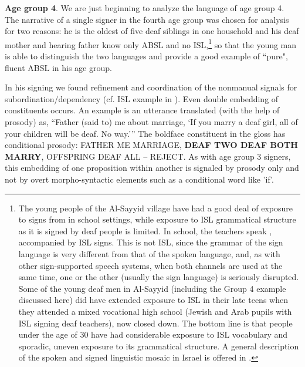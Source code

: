 \documentclass[output=paper]{langsci/langscibook}
\begin{document}
\largerpage[-1] 
\textbf{Age group 4}.  We are just beginning to analyze the language of age group 4.  The narrative of a single signer in the fourth age group was chosen for analysis for two reasons:  he is the oldest of five deaf siblings in one household and his deaf mother and hearing father know only ABSL and no ISL,\footnote{The young people of the Al-Sayyid village have had a good deal of exposure to signs from  in school settings, while exposure to ISL grammatical structure as it is signed by deaf people is limited.  In school, the teachers speak , accompanied by ISL signs. This is not ISL, since the grammar of the sign language is very different from that of the spoken language, and, as with other sign-supported speech systems, when both channels are used at the same time, one or the other (usually the sign language) is seriously disrupted.  Some of the young deaf men in Al-Sayyid (including the Group 4 example discussed here) did have extended exposure to ISL in their late teens when they attended a mixed vocational high school (Jewish and Arab pupils with ISL signing deaf teachers), now closed down. The bottom line is that people under the age of 30 have had considerable exposure to ISL vocabulary and sporadic, uneven exposure to its grammatical structure.  A general description of the spoken and signed linguistic mosaic in Israel is offered in \citet{Sandler2014nordlyd}.} so that the young man is able to distinguish the two languages and provide a good example of ``pure", fluent ABSL in his age group.

In his signing we found refinement and coordination of the nonmanual signals for subordination/dependency (cf. ISL example in ).  Even double embedding of constituents occurs.  An example is an utterance translated (with the help of prosody) as, “Father (said to) me about marriage, ‘If you marry a deaf girl, all of your children will be deaf.  No way.’” The boldface constituent in the gloss has conditional prosody: FATHER ME MARRIAGE, \textbf{DEAF TWO DEAF BOTH MARRY}, OFFSPRING DEAF ALL – REJECT.  As with age group 3 signers, this embedding of one proposition within another is signaled by prosody only and not by overt morpho-syntactic elements such as a conditional word like 'if'.  
\end{document}
